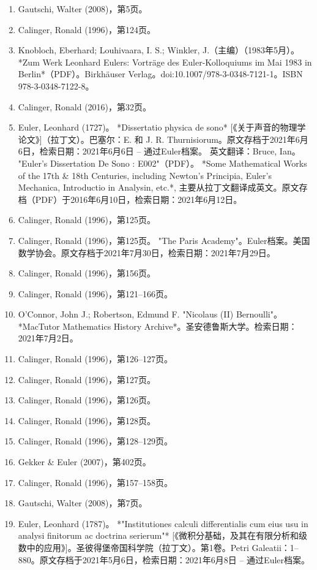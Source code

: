 \begin{enumerate}
\item Gautschi, Walter (2008)，第5页。  
\item Calinger, Ronald (1996)，第124页。  
\item Knobloch, Eberhard; Louhivaara, I. S.; Winkler, J.（主编）（1983年5月）。 *Zum Werk Leonhard Eulers: Vorträge des Euler-Kolloquiums im Mai 1983 in Berlin*（PDF）。Birkhäuser Verlag。doi:10.1007/978-3-0348-7121-1。ISBN 978-3-0348-7122-8。  
\item Calinger, Ronald (2016)，第32页。
\item Euler, Leonhard (1727)。 *Dissertatio physica de sono* [《关于声音的物理学论文》]（拉丁文）。巴塞尔：E. 和 J. R. Thurnisiorum。原文存档于2021年6月6日，检索日期：2021年6月6日 – 通过Euler档案。  
英文翻译：Bruce, Ian。 "Euler's Dissertation De Sono : E002"（PDF）。 *Some Mathematical Works of the 17th & 18th Centuries, including Newton's Principia, Euler's Mechanica, Introductio in Analysin, etc.*, 主要从拉丁文翻译成英文。原文存档（PDF）于2016年6月10日，检索日期：2021年6月12日。  
\item Calinger, Ronald (1996)，第125页。  
\item Calinger, Ronald (1996)，第125页。  
"The Paris Academy"。Euler档案。美国数学协会。原文存档于2021年7月30日，检索日期：2021年7月29日。  
\item Calinger, Ronald (1996)，第156页。  
\item Calinger, Ronald (1996)，第121–166页。  
\item O'Connor, John J.; Robertson, Edmund F. "Nicolaus (II) Bernoulli"。 *MacTutor Mathematics History Archive*。圣安德鲁斯大学。检索日期：2021年7月2日。  
\item Calinger, Ronald (1996)，第126–127页。  
\item Calinger, Ronald (1996)，第127页。
\item Calinger, Ronald (1996)，第126页。  
\item Calinger, Ronald (1996)，第128页。  
\item Calinger, Ronald (1996)，第128–129页。  
\item Gekker & Euler (2007)，第402页。  
\item Calinger, Ronald (1996)，第157–158页。  
\item Gautschi, Walter (2008)，第7页。  
\item Euler, Leonhard (1787)。 *"Institutiones calculi differentialis cum eius usu in analysi finitorum ac doctrina serierum"* [《微积分基础，及其在有限分析和级数中的应用》]。圣彼得堡帝国科学院（拉丁文）。第1卷。Petri Galeatii：1–880。原文存档于2021年5月6日，检索日期：2021年6月8日 – 通过Euler档案。  

\end{enumerate}
